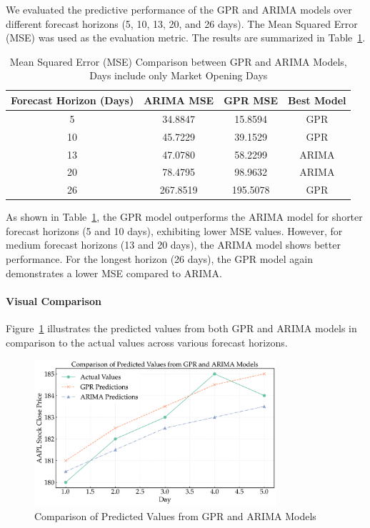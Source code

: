 We evaluated the predictive performance of the GPR and ARIMA models over different forecast horizons (5, 10, 13, 20, and 26 days). The Mean Squared Error (MSE) was used as the evaluation metric. The results are summarized in Table~\ref{tab:mse_comparison}.

\begin{table}[htbp]
\centering
\caption{Mean Squared Error (MSE) Comparison between GPR and ARIMA Models, Days include only Market Opening Days}
\label{tab:mse_comparison}
\begin{tabular}{cccc}
\toprule
\textbf{Forecast Horizon (Days)} & \textbf{ARIMA MSE} & \textbf{GPR MSE} & \textbf{Best Model} \\
\midrule
5  & 34.8847 & 15.8594 & GPR \\
10 & 45.7229 & 39.1529 & GPR \\
13 & 47.0780 & 58.2299 & ARIMA \\
20 & 78.4795 & 98.9632 & ARIMA \\
26 & 267.8519 & 195.5078 & GPR \\
\bottomrule
\end{tabular}
\end{table}

As shown in Table~\ref{tab:mse_comparison}, the GPR model outperforms the \ac{ARIMA} model for shorter forecast horizons (5 and 10 days), exhibiting lower MSE values. However, for medium forecast horizons (13 and 20 days), the ARIMA model shows better performance. For the longest horizon (26 days), the GPR model again demonstrates a lower MSE compared to ARIMA.

\paragraph{Visual Comparison}

Figure~\ref{fig:prediction_comparison} illustrates the predicted values from both \ac{GPR} and \ac{ARIMA} models in comparison to the actual values across various forecast horizons.

\begin{figure}[htbp]
\centering
\includegraphics[width=0.8\textwidth]{figures/prediction_comparison.png}
\caption{Comparison of Predicted Values from GPR and ARIMA Models}
\label{fig:prediction_comparison}
\end{figure}

